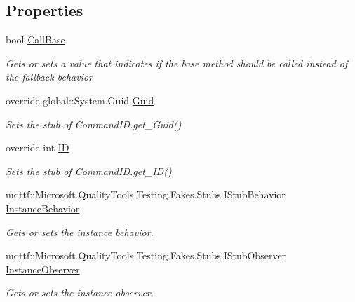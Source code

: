 \subsection*{Properties}
\begin{DoxyCompactItemize}
\item 
bool \hyperlink{class_system_1_1_component_model_1_1_design_1_1_fakes_1_1_stub_command_i_d_a951232f5ca677b64f9df5f17f602cd51}{Call\-Base}
\begin{DoxyCompactList}\small\item\em Gets or sets a value that indicates if the base method should be called instead of the fallback behavior\end{DoxyCompactList}\item 
override global\-::\-System.\-Guid \hyperlink{class_system_1_1_component_model_1_1_design_1_1_fakes_1_1_stub_command_i_d_ac058b619634ebdbe780d6f8f12caaf99}{Guid}
\begin{DoxyCompactList}\small\item\em Sets the stub of Command\-I\-D.\-get\-\_\-\-Guid()\end{DoxyCompactList}\item 
override int \hyperlink{class_system_1_1_component_model_1_1_design_1_1_fakes_1_1_stub_command_i_d_a964a609f030142e71fc53ec2615ea3b4}{I\-D}
\begin{DoxyCompactList}\small\item\em Sets the stub of Command\-I\-D.\-get\-\_\-\-I\-D()\end{DoxyCompactList}\item 
mqttf\-::\-Microsoft.\-Quality\-Tools.\-Testing.\-Fakes.\-Stubs.\-I\-Stub\-Behavior \hyperlink{class_system_1_1_component_model_1_1_design_1_1_fakes_1_1_stub_command_i_d_ae65847308906c681260173492a10cbed}{Instance\-Behavior}
\begin{DoxyCompactList}\small\item\em Gets or sets the instance behavior.\end{DoxyCompactList}\item 
mqttf\-::\-Microsoft.\-Quality\-Tools.\-Testing.\-Fakes.\-Stubs.\-I\-Stub\-Observer \hyperlink{class_system_1_1_component_model_1_1_design_1_1_fakes_1_1_stub_command_i_d_a6e2d8a85d00f40118dc981f0029d33fb}{Instance\-Observer}
\begin{DoxyCompactList}\small\item\em Gets or sets the instance observer.\end{DoxyCompactList}\end{DoxyCompactItemize}


